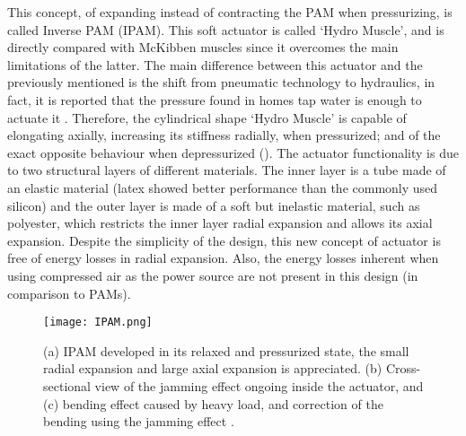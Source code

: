 This concept, of expanding instead of contracting the PAM when pressurizing, is called Inverse PAM (IPAM). This soft actuator is called `Hydro Muscle', and is directly compared with McKibben muscles since it overcomes the main limitations of the latter. The main difference between this actuator and the previously mentioned is the shift from pneumatic technology to hydraulics, in fact, it is reported that the pressure found in homes tap water is enough to actuate it \cite{Sridar2016}. Therefore, the cylindrical shape `Hydro Muscle' is capable of elongating axially, increasing its stiffness radially, when pressurized; and of the exact opposite behaviour when depressurized (). The actuator functionality is due to two structural layers of different materials. The inner layer is a tube made of an elastic material (latex showed better performance than the commonly used silicon) and the outer layer is made of a soft but inelastic material, such as polyester, which restricts the inner layer radial expansion and allows its axial expansion. Despite the simplicity of the design, this new concept of actuator is free of energy losses in radial expansion. Also, the energy losses inherent when using compressed air as the power source are not present in this design (in comparison to PAMs).
\begin{figure}[hbtp!]
    \centering
    \texttt{[image: IPAM.png]}
    \caption[(a) IPAM developed in its relaxed and pressurized state, the small radial expansion and large axial expansion is appreciated. (b) Cross-sectional view of the jamming effect ongoing inside the actuator, and (c) bending effect caused by heavy load, and correction of the bending using the jamming effect.]{(a) IPAM developed in its relaxed and pressurized state, the small radial expansion and large axial expansion is appreciated. (b) Cross-sectional view of the jamming effect ongoing inside the actuator, and (c) bending effect caused by heavy load, and correction of the bending using the jamming effect \cite{Sridar2016}. }
    \label{fig:IPAM}
\end{figure}

